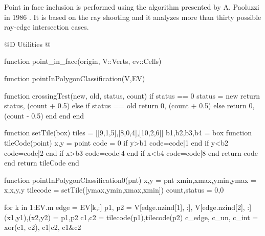 Point in face inclusion is performed using the algorithm
presented by A. Paoluzzi in 1986 \cite{Paoluzzi-ART1986}.
It is based on the ray shooting and it analyzes more than
thirty possible ray-edge intersection cases.

@D Utilities
@{function point_in_face(origin, V::Verts, ev::Cells)

    function pointInPolygonClassification(V,EV)

        function crossingTest(new, old, status, count)
        if status == 0
            status = new
            return status, (count + 0.5)
        else
            if status == old
                return 0, (count + 0.5)
            else
                return 0, (count - 0.5)
            end
        end
        end

        function setTile(box)
        tiles = [[9,1,5],[8,0,4],[10,2,6]]
        b1,b2,b3,b4 = box
        function tileCode(point)
            x,y = point
            code = 0
            if y>b1 code=code|1 end
            if y<b2 code=code|2 end
            if x>b3 code=code|4 end
            if x<b4 code=code|8 end
            return code
        end
        return tileCode
        end

        function pointInPolygonClassification0(pnt)
            x,y = pnt
            xmin,xmax,ymin,ymax = x,x,y,y
            tilecode = setTile([ymax,ymin,xmax,xmin])
            count,status = 0,0

            for k in 1:EV.m
                edge = EV[k,:]
                p1, p2 = V[edge.nzind[1], :], V[edge.nzind[2], :]
                (x1,y1),(x2,y2) = p1,p2
                c1,c2 = tilecode(p1),tilecode(p2)
                c_edge, c_un, c_int = xor(c1, c2), c1|c2, c1&c2
                
}
